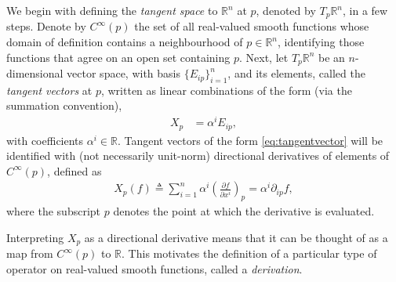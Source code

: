 \documentclass[psamsfonts]{amsart}
\theoremstyle{definition}
\theoremstyle{remark}
\newcommand*\R{\mathds{R}}
\numberwithin{equation}{section}
\begin{document}
We begin with defining the \textit{tangent space} to $\R^n$ at $p$, denoted by $T_p\R^n$, in a few steps. Denote by $C^{\infty}(p)$ the set of all real-valued smooth functions whose domain of definition contains a neighbourhood of $p\in \R^n$, {identifying} those functions that agree on an open set containing $p$. Next, let $T_p\R^n$ be an $n$-dimensional vector space, with basis $\{E_{ip}\}_{i=1}^{n}$, and its elements, called the \textit{tangent vectors} at $p$, written as linear combinations of the form (via the summation convention),
\begin{align}\label{eq:tangentvector}
X_p &={} \alpha^i E_{ip},
\end{align}
with coefficients $\alpha^i \in \R$. Tangent vectors of the form \ref{eq:tangentvector} will be identified with (not necessarily unit-norm) directional derivatives of elements of $C^{\infty}(p)$, defined as
\begin{equation}
\begin{aligned}
X_p(f) \triangleq \sum_{i = 1}^n \alpha^i \left(\frac{\partial f}{\partial x^i}\right)_p = \alpha^i \partial_{ip} f,
\end{aligned}
\end{equation}
where the subscript $p$ denotes the point at which the derivative is evaluated. 

Interpreting $X_p$ as a directional derivative means that it can be thought of as a map from $C^{\infty}(p)$ to $\R$. This motivates the definition of a particular type of operator on real-valued smooth functions, called a \textit{derivation}. 
\end{document}
